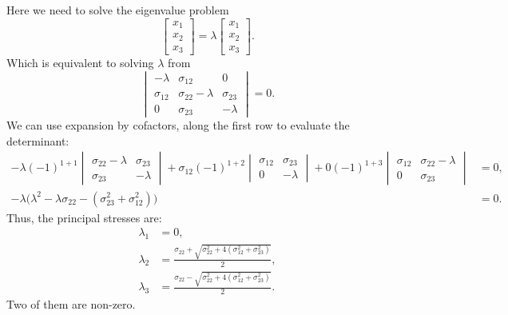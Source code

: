 \documentclass[12pt]{article}
\begin{document}
\begin{itemize}
	      Here we need to solve the eigenvalue problem
	      \begin{equation}
		      [\sigma] \begin{bmatrix}
			      x_1 \\
			      x_2 \\
			      x_3
		      \end{bmatrix} = \lambda
		      \begin{bmatrix}
			      x_1 \\
			      x_2 \\
			      x_3
		      \end{bmatrix}.
	      \end{equation}
	      Which is equivalent to solving $\lambda$ from
	      \begin{equation}
		      \begin{vmatrix}
			      -\lambda    & \sigma_{12}           & 0           \\
			      \sigma_{12} & \sigma_{22} - \lambda & \sigma_{23} \\
			      0           & \sigma_{23}           & -\lambda
		      \end{vmatrix} = 0.
	      \end{equation}
	      We can use expansion by cofactors, along the first row to evaluate the determinant:
	      \begin{align}
		      -\lambda (-1)^{1+1}
		      \begin{vmatrix}
			      \sigma_{22} - \lambda & \sigma_{23} \\
			      \sigma_{23}           & -\lambda
		      \end{vmatrix}
		      + \sigma_{12} (-1)^{1+2}
		      \begin{vmatrix}
			      \sigma_{12} & \sigma_{23} \\
			      0           & -\lambda
		      \end{vmatrix}
		      + 0 (-1)^{1+3}
		      \begin{vmatrix}
			      \sigma_{12} & \sigma_{22} - \lambda \\
			      0           & \sigma_{23}
		      \end{vmatrix}                                                       & = 0, \\
		      -\lambda \Big( \lambda^2 - \lambda \sigma_{22} - (\sigma_{23}^2 + \sigma_{12}^2) \Big) & = 0.
	      \end{align}
	      Thus, the principal stresses are:
	      \begin{align}\label{eq:lambdas}
		      \lambda_1 & = 0,                                                                                   \\
		      \lambda_2 & = \frac{ \sigma_{22} + \sqrt{\sigma_{22}^2 + 4(\sigma_{12}^2 + \sigma_{23}^2)} }{ 2 }, \\
		      \lambda_3 & = \frac{ \sigma_{22} - \sqrt{\sigma_{22}^2 + 4(\sigma_{12}^2 + \sigma_{23}^2)} }{ 2 }.
	      \end{align}
	      Two of them are non-zero.


\end{itemize}
\end{document}
